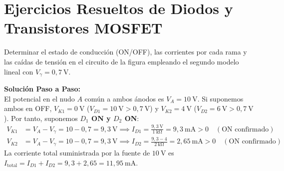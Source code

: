 \section{Ejercicios Resueltos de Diodos y Transistores MOSFET}

\begin{ejercicio}
Determinar el estado de conducción (ON/OFF), las corrientes por cada rama y las caídas de tensión en el circuito de la figura empleando el segundo modelo lineal con $V_\gamma = 0{,}7\ \si{\volt}$.
\tcbline
\begin{center}
\end{center}
\textbf{Solución Paso a Paso:}\\[4pt]
El potencial en el nudo $A$ común a ambos ánodos es $V_A = 10\ \si{\volt}$. Si suponemos ambos en OFF, $V_{K1} = 0\ \si{\volt}$ ($V_{D1} = 10\ \si{\volt} > 0{,}7\ \si{\volt}$) y $V_{K2} = 4\ \si{\volt}$ ($V_{D2} = 6\ \si{\volt} > 0{,}7\ \si{\volt}$). Por tanto, suponemos \textbf{$D_1$ ON y $D_2$ ON}:
\begin{align}
    V_{K1} &= V_A - V_\gamma = 10 - 0{,}7 = 9{,}3\ \si{\volt} \implies I_{D1} = \frac{9{,}3\ \si{\volt}}{1\ \si{\kilo\ohm}} = 9{,}3\ \si{\milli\ampere} > 0 \quad (\text{ON confirmado}) \\
    V_{K2} &= V_A - V_\gamma = 10 - 0{,}7 = 9{,}3\ \si{\volt} \implies I_{D2} = \frac{9{,}3 - 4}{2\ \si{\kilo\ohm}} = 2{,}65\ \si{\milli\ampere} > 0 \quad (\text{ON confirmado})
\end{align}
La corriente total suministrada por la fuente de $10\ \si{\volt}$ es $I_{\text{total}} = I_{D1} + I_{D2} = 9{,}3 + 2{,}65 = 11{,}95\ \si{\milli\ampere}$.
\end{ejercicio}

